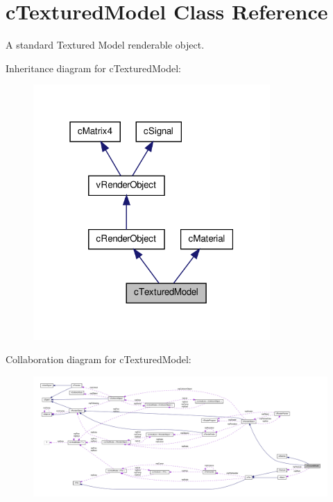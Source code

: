 \hypertarget{classc_textured_model}{
\section{cTexturedModel Class Reference}
\label{classc_textured_model}
}


A standard Textured Model renderable object.  




Inheritance diagram for cTexturedModel:
\nopagebreak
\begin{figure}[H]
\begin{center}
\leavevmode
\includegraphics[width=256pt]{classc_textured_model__inherit__graph}
\end{center}
\end{figure}


Collaboration diagram for cTexturedModel:
\nopagebreak
\begin{figure}[H]
\begin{center}
\leavevmode
\includegraphics[width=400pt]{classc_textured_model__coll__graph}
\end{center}
\end{figure}
